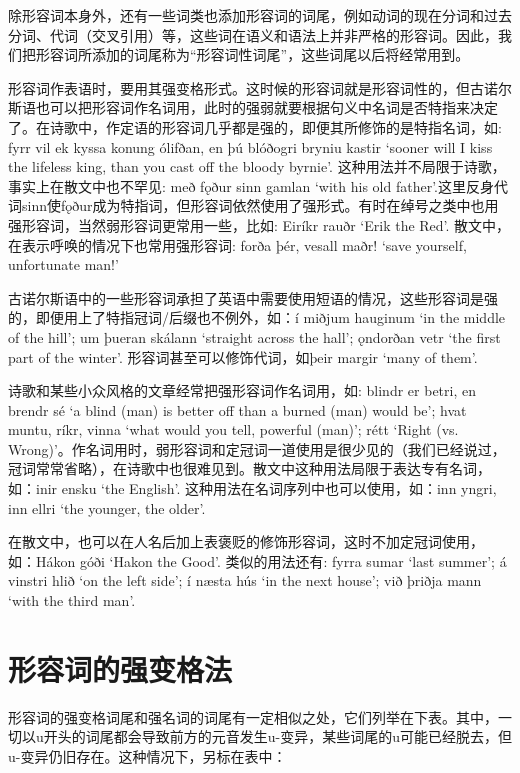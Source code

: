 除形容词本身外，还有一些词类也添加形容词的词尾，例如动词的现在分词和过去分词、代词（交叉引用）等，这些词在语义和语法上并非严格的形容词。因此，我们把形容词所添加的词尾称为“形容词性词尾”，这些词尾以后将经常用到。

形容词作表语时，要用其强变格形式。这时候的形容词就是形容词性的，但古诺尔斯语也可以把形容词作名词用，此时的强弱就要根据句义中名词是否特指来决定了。在诗歌中，作定语的形容词几乎都是强的，即便其所修饰的是特指名词，如:
fyrr vil ek kyssa konung ólifðan, en þú blóðogri bryniu kastir `sooner
will I kiss the lifeless king, than you cast off the bloody byrnie‌'.
这种用法并不局限于诗歌，事实上在散文中也不罕见: með fǫður sinn gamlan
`with his old
father‌'.这里反身代词sinn使fǫður成为特指词，但形容词依然使用了强形式。有时在绰号之类中也用强形容词，当然弱形容词更常用一些，比如:
Eiríkr rauðr `Erik the Red‌'. 散文中，在表示呼唤的情况下也常用强形容词:
forða þér, vesall maðr! `save yourself, unfortunate man!‌'

古诺尔斯语中的一些形容词承担了英语中需要使用短语的情况，这些形容词是强的，即便用上了特指冠词/后缀也不例外，如：í
miðjum hauginum `in the middle of the hill‌'; um þueran skálann `straight
across the hall‌'; ǫndorðan vetr `the first part of the winter‌'.
形容词甚至可以修饰代词，如þeir margir `many of them‌'.

诗歌和某些小众风格的文章经常把强形容词作名词用，如: blindr er betri, en
brendr sé `a blind (man) is better off than a burned (man) would be‌';
hvat muntu, ríkr, vinna `what would you tell, powerful (man)‌'; rétt
`Right (vs.
Wrong)‌'。作名词用时，弱形容词和定冠词一道使用是很少见的（我们已经说过，冠词常常省略），在诗歌中也很难见到。散文中这种用法局限于表达专有名词，如：inir
ensku `the English‌'. 这种用法在名词序列中也可以使用，如：inn yngri, inn
ellri `the younger, the older‌'.

在散文中，也可以在人名后加上表褒贬的修饰形容词，这时不加定冠词使用，
如：Hákon góði `Hakon the Good‌'. 类似的用法还有: fyrra sumar `last
summer‌'; á vinstri hlið `on the left side‌'; í næsta hús `in the next
house‌'; við þriðja mann `with the third man‌'.

\section{形容词的强变格法}\label{形容词的强变格法}

形容词的强变格词尾和强名词的词尾有一定相似之处，它们列举在下表。其中，一切以u开头的词尾都会导致前方的元音发生u-变异，某些词尾的u可能已经脱去，但u-变异仍旧存在。这种情况下，另标在表中：

